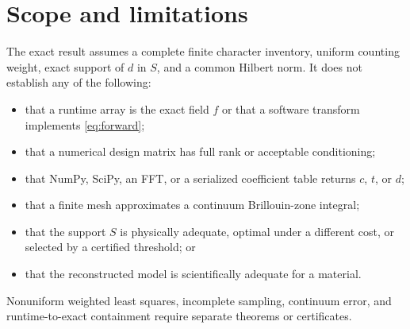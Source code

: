 \documentclass[11pt]{article}
\begin{document}
\section{Scope and limitations}
The exact result assumes a complete finite character inventory, uniform counting weight, exact
support of $d$ in $S$, and a common Hilbert norm.  It does not establish any of the following:
\begin{itemize}
  \item that a runtime array is the exact field $f$ or that a software transform implements
        \eqref{eq:forward};
  \item that a numerical design matrix has full rank or acceptable conditioning;
  \item that NumPy, SciPy, an FFT, or a serialized coefficient table returns $c$, $t$, or $d$;
  \item that a finite mesh approximates a continuum Brillouin-zone integral;
  \item that the support $S$ is physically adequate, optimal under a different cost, or selected
        by a certified threshold; or
  \item that the reconstructed model is scientifically adequate for a material.
\end{itemize}
Nonuniform weighted least squares, incomplete sampling, continuum error, and runtime-to-exact
containment require separate theorems or certificates.

\printbibliography[title={References}]
\end{document}
